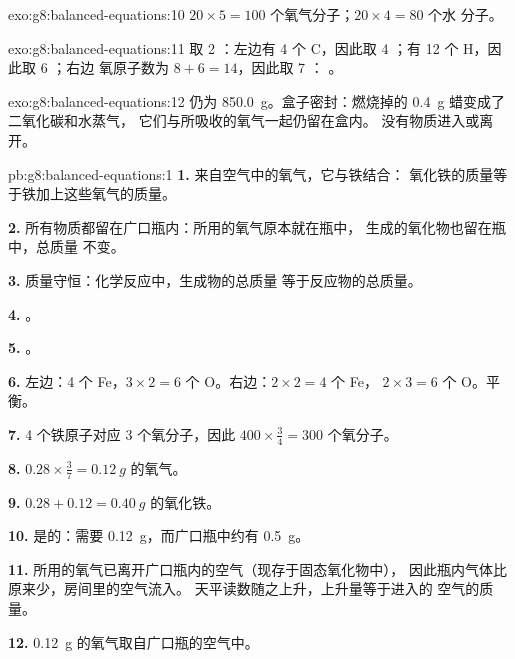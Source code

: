 \begin{solution}{exo:g8:balanced-equations:10}
$20 \times 5 = 100$ 个氧气分子；$20 \times 4 = 80$ 个水
分子。
\end{solution}

\begin{solution}{exo:g8:balanced-equations:11}
取 2 ：左边有 4 个 C，因此取 4 ；有 12 个 H，因此取 6 ；右边
氧原子数为 $8 + 6 = 14$，因此取 7 ：
。
\end{solution}

\begin{solution}{exo:g8:balanced-equations:12}
仍为 \qty{850.0}{g}。盒子密封：燃烧掉的 \qty{0.4}{g} 蜡变成了二氧化碳和水蒸气，
它们与所吸收的氧气一起仍留在盒内。
没有物质进入或离开。
\end{solution}

\begin{solution}{pb:g8:balanced-equations:1}
\textbf{1.} 来自空气中的氧气，它与铁结合：
氧化铁的质量等于铁加上这些氧气的质量。

\textbf{2.} 所有物质都留在广口瓶内：所用的氧气原本就在瓶中，
生成的氧化物也留在瓶中，总质量
不变。

\textbf{3.} 质量守恒：化学反应中，生成物的总质量
等于反应物的总质量。

\textbf{4.} 。

\textbf{5.} 。

\textbf{6.} 左边：4 个 Fe，$3 \times 2 = 6$ 个 O。右边：$2 \times 2 = 4$ 个 Fe，
$2 \times 3 = 6$ 个 O。平衡。

\textbf{7.} 4 个铁原子对应 3 个氧分子，因此 $400 \times
\frac{3}{4} = 300$ 个氧分子。

\textbf{8.} $0.28 \times \frac{3}{7} = \qty{0.12}{g}$ 的氧气。

\textbf{9.} $0.28 + 0.12 = \qty{0.40}{g}$ 的氧化铁。

\textbf{10.} 是的：需要 \qty{0.12}{g}，而广口瓶中约有
\qty{0.5}{g}。

\textbf{11.} 所用的氧气已离开广口瓶内的空气（现存于固态氧化物中），
因此瓶内气体比原来少，房间里的空气流入。
天平读数随之上升，上升量等于进入的
空气的质量。

\textbf{12.} \qty{0.12}{g} 的氧气取自广口瓶的空气中。
\end{solution}
